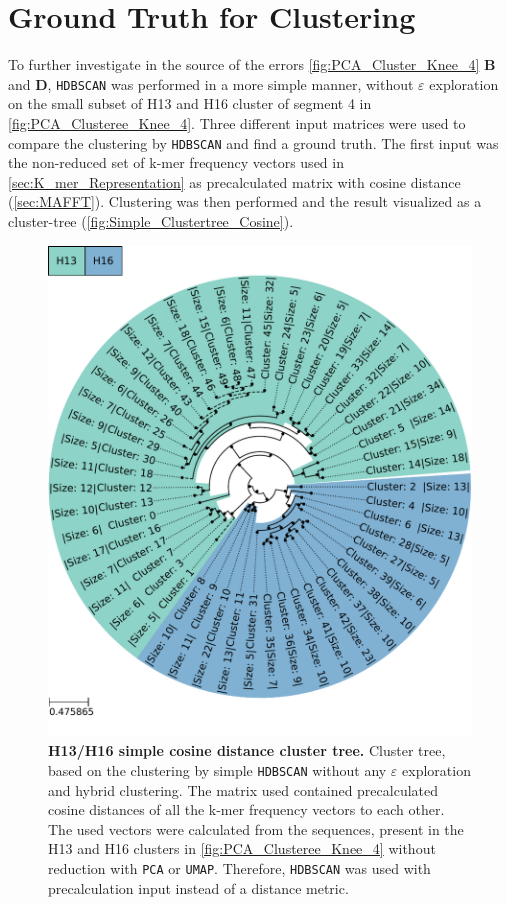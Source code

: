 \section{Ground Truth for Clustering} \label{sec:Comparison_Clustering}

To further investigate in the source of the errors \autoref{fig:PCA_Cluster_Knee_4} \textbf{\textsf{B}} and \textbf{\textsf{D}}, \texttt{HDBSCAN} was performed in a more simple manner, without $\varepsilon$ exploration on the small subset of H13 and H16 cluster of segment 4 in \autoref{fig:PCA_Clusteree_Knee_4}. Three different input matrices were used to compare the clustering by \texttt{HDBSCAN} and find a ground truth. The first input was the non-reduced set of k-mer frequency vectors used in \autoref{sec:K_mer_Representation} as precalculated matrix with cosine distance (\autoref{sec:MAFFT}). Clustering was then performed and the result visualized as a cluster-tree (\autoref{fig:Simple_Clustertree_Cosine}). 

\begin{figure}[!hbt]
    \centering
    \includegraphics[width=\textwidth]{PCA/Clustertree_Segment_4_H_Cosine.pdf}
    \caption[H13/H16 simple precalculated cosine distance cluster tree]{\textbf{H13/H16 simple cosine distance cluster tree.} Cluster tree, based on the clustering by simple \texttt{HDBSCAN} without any $\varepsilon$ exploration and hybrid clustering. The matrix used contained precalculated cosine distances of all the k-mer frequency vectors to each other. The used vectors were calculated from the sequences, present in the H13 and H16 clusters in \autoref{fig:PCA_Clusteree_Knee_4} without reduction with \texttt{PCA} or \texttt{UMAP}. Therefore, \texttt{HDBSCAN} was used with precalculation input instead of a distance metric.}
    \label{fig:Simple_Clustertree_Cosine}
\end{figure}

